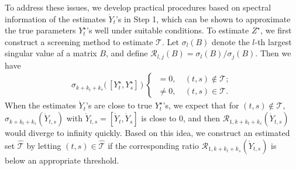 \documentclass[12pt]{article}
\begin{document}
To address these issues, we develop practical procedures based on spectral information of the estimates $\mathring{Y}_t$'s in Step 1, which can be shown to approximate the true parameters $Y_t^{\star}$'s well under suitable conditions.  
To estimate $Z^{\star}$, 
we first construct a screening method to estimate $\mathcal{T}$. 
Let $\sigma_l(B)$ denote the $l$-th  largest singular value af a  matrix $B$, and 
define 
$\mathcal{R}_{l,j}(B)=\sigma_l(B)/\sigma_j(B) $. %
Then we have
\begin{align*}
 \sigma_{k+k_t+k_s}\big(\, [Y_t^{\star}, Y_s^{\star}] \, \big)   \  \begin{cases}
  \ =     0,  & \ (t,s)\not \in \mathcal{T};\\
 \   \neq 0, & \     (t,s) \in \mathcal{T}.
    \end{cases}
\end{align*}
When the estimates $\mathring{Y}_t$'s  are close to true $Y_t^{\star}$'s, 
we expect that for $(t,s) \not\in \mathcal{T}$, $\sigma_{k+k_t+k_s}( \mathring{Y}_{t,s})$ with $\mathring{Y}_{t,s}=[\mathring{Y}_t, \mathring{Y}_s]$ is close to 0,  
and then $ \mathcal{R}_{1, k+k_t+k_s}(\mathring{Y}_{t,s})$ would diverge to infinity quickly. %
Based on this idea,  
we construct an estimated set $\hat{\mathcal{T}}$ by letting  $(t,s)\in \hat{\mathcal{T}}$ if  the corresponding  ratio $ \mathcal{R}_{1, k+k_t+k_s}(\mathring{Y}_{t,s})$ is below an appropriate threshold.  
\end{document}
